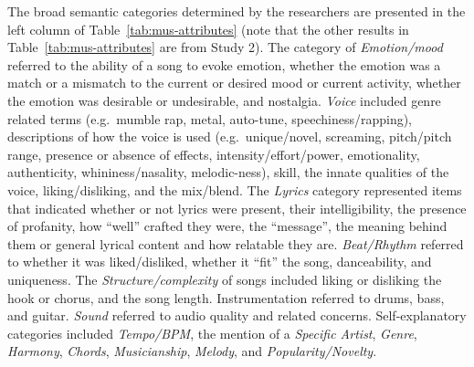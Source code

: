 \documentclass{article}
\begin{document}
The broad semantic categories determined by the researchers are presented in the left column of Table~\ref{tab:mus-attributes} (note that the other results in Table~\ref{tab:mus-attributes} are from Study 2).
The category of \textit{Emotion/mood} referred to the ability of a song to evoke emotion, whether the emotion was a match or a mismatch to the current or desired mood or current activity, whether the emotion was desirable or undesirable, and nostalgia.
\textit{Voice} included genre related terms (e.g.~mumble rap, metal, auto-tune, speechiness/rapping), descriptions of how the voice is used (e.g.~unique/novel, screaming, pitch/pitch range, presence or absence of effects, intensity/effort/power, emotionality, authenticity, whininess/nasality, melodic-ness), skill, the innate qualities of the voice, liking/disliking, and the mix/blend.
The \textit{Lyrics} category represented items that indicated whether or not lyrics were present, their intelligibility, the presence of profanity, how ``well'' crafted they were, the ``message'', the meaning behind them or general lyrical content and how relatable they are.
\textit{Beat/Rhythm} referred to whether it was liked/disliked, whether it ``fit'' the song, danceability, and uniqueness.
The \textit{Structure/complexity} of songs included liking or disliking the hook or chorus, and the song length.
Instrumentation referred to drums, bass, and guitar.
\textit{Sound} referred to audio quality and related concerns.
Self-explanatory categories included \textit{Tempo/BPM}, the mention of a \textit{Specific Artist}, \textit{Genre}, \textit{Harmony}, \textit{Chords}, \textit{Musicianship}, \textit{Melody}, and \textit{Popularity/Novelty}.



\end{document}
